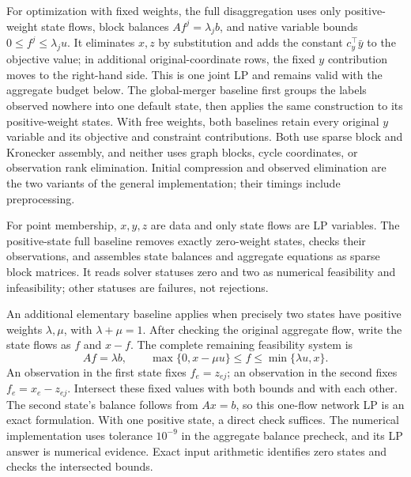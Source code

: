 For optimization with fixed weights, the full disaggregation uses only
positive-weight state flows, block balances $Af^j=\lambda_j b$, and native
variable bounds $0\le f^j\le\lambda_j u$. It eliminates $x,z$ by substitution
and adds the constant $c_y^\top\bar y$ to the objective value; in additional
original-coordinate rows, the fixed $y$ contribution moves to the right-hand
side. This is one joint LP and remains valid with the aggregate budget below.
The global-merger baseline first groups the labels observed nowhere into one
default state, then applies the same construction to its positive-weight
states. With free weights, both baselines retain every original $y$ variable
and its objective and constraint contributions. Both use sparse block and
Kronecker assembly, and neither uses graph blocks, cycle coordinates, or
observation rank elimination. Initial compression and observed elimination
are the two variants of the general implementation; their timings include
preprocessing.

For point membership, $x,y,z$ are data and only state flows are LP variables.
The positive-state full baseline removes exactly zero-weight states, checks
their observations, and assembles state balances and aggregate equations as
sparse block matrices. It reads solver statuses zero and two as numerical
feasibility and infeasibility; other statuses are failures, not rejections.

An additional elementary baseline applies when precisely two states have
positive weights $\lambda,\mu$, with $\lambda+\mu=1$. After checking
the original aggregate flow, write the state flows as $f$ and $x-f$.
The complete remaining feasibility system is
\begin{equation}\label{eq:two-state-membership-lp}
 Af=\lambda b,\qquad
 \max\{0,x-\mu u\}\le f\le\min\{\lambda u,x\}.
\end{equation}
An observation in the first state fixes $f_e=z_{ej}$; an observation
in the second fixes $f_e=x_e-z_{ej}$. Intersect these fixed values
with both bounds and with each other. The second state's balance follows
from $Ax=b$, so this one-flow network LP is an exact formulation. With one
positive state, a direct check suffices. The numerical implementation uses
tolerance $10^{-9}$ in the aggregate balance precheck, and its LP answer is
numerical evidence. Exact input arithmetic identifies zero states and
checks the intersected bounds.

